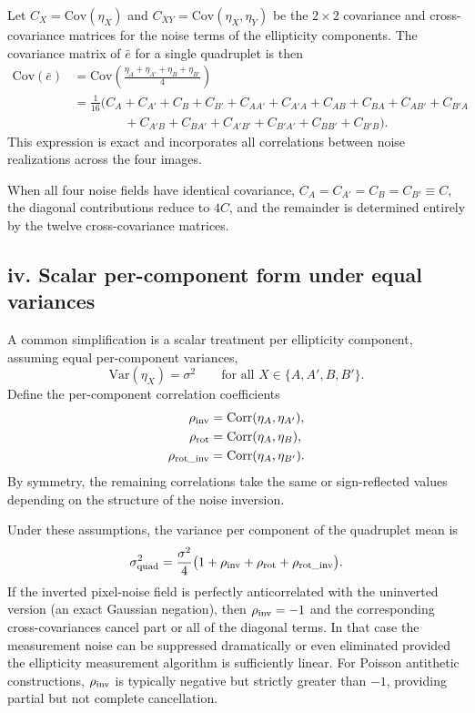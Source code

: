 \documentclass[11pt]{EuclidVIS}
\numberwithin{table}{section}
\numberwithin{figure}{section}
\begin{document}
Let $C_X=\mathrm{Cov}(\eta_X)$ and 
$C_{XY}=\mathrm{Cov}(\eta_X,\eta_Y)$ be the $2\times2$ covariance
and cross-covariance matrices for the noise terms of the
ellipticity components.
The covariance matrix of $\bar e$ for a single quadruplet is then
\begin{align}
\mathrm{Cov}(\bar e)
&= \mathrm{Cov}\!\left(\frac{\eta_A + \eta_{A'} + \eta_B + \eta_{B'}}{4}\right) \\
&= \frac{1}{16}\big(C_A + C_{A'} + C_B + C_{B'} 
    + C_{AA'} + C_{A'A} + C_{AB} + C_{BA}
    + C_{AB'} + C_{B'A} \nonumber \\
&\qquad\qquad 
    + C_{A'B} + C_{BA'} + C_{A'B'} + C_{B'A'}
    + C_{BB'} + C_{B'B}\big).
\end{align}
This expression is exact and incorporates all correlations between
noise realizations across the four images.

When all four noise fields have identical covariance,
$C_A=C_{A'}=C_B=C_{B'}\equiv C$,
the diagonal contributions reduce to $4C$, and the remainder is determined
entirely by the twelve cross-covariance matrices.

\subsection*{iv. Scalar per-component form under equal variances}

A common simplification is a scalar treatment per ellipticity component,
assuming equal per-component variances,
\begin{equation}
\mathrm{Var}(\eta_X)=\sigma^2 \qquad
\text{for all } X\in\{A,A',B,B'\}.
\end{equation}
Define the per-component correlation coefficients
\begin{align}
\rho_{\rm inv} &= \mathrm{Corr}(\eta_A,\eta_{A'}),\\
\rho_{\rm rot} &= \mathrm{Corr}(\eta_A,\eta_{B}), \\
\rho_{\rm rot\_inv} &= \mathrm{Corr}(\eta_A,\eta_{B'}).
\end{align}
By symmetry, the remaining correlations take the same or sign-reflected
values depending on the structure of the noise inversion.

Under these assumptions, the variance per component of the quadruplet mean is
\begin{equation}
\sigma_{\rm quad}^2
= \frac{\sigma^2}{4}
  \big(1 + \rho_{\rm inv} + \rho_{\rm rot} + \rho_{\rm rot\_inv}\big).
\end{equation}
If the inverted pixel-noise field is perfectly anticorrelated with the
uninverted version (an exact Gaussian negation), then
$\rho_{\rm inv}=-1$ and the corresponding cross-covariances cancel part or all 
of the diagonal terms.
In that case the measurement noise can be suppressed dramatically or even
eliminated provided the ellipticity measurement algorithm is sufficiently
linear.
For Poisson antithetic constructions, $\rho_{\rm inv}$ is typically negative
but strictly greater than $-1$, providing partial but not complete cancellation.
\end{document}
